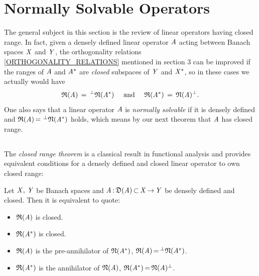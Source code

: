 \documentclass[11pt,twoside]{article}
\begin{document}
\section{Normally Solvable Operators}                                          %
The general subject in this section is the review of linear operators
having closed range.
In fact,
given a densely defined linear operator $\mathit{A}$
acting between Banach spaces $\mathit{X}$ and $\mathit{Y}$,
the orthogonality relations \eqref{ORTHOGONALITY_RELATIONS}
mentioned in section 3 can be improved
if the ranges of $\mathit{A}$ and $\mathit{A}^*$ are \textit{closed} subspaces
of $\mathit{Y}$ and $\mathit{X}^*$,
so in these cases we actually would have
\[
{\mathfrak{R}(\mathit{A}) } \,=\, ^{\bot}\mathfrak{N}(\mathit{A}^*)
\quad \mbox{ and } \quad
{\mathfrak{R}(\mathit{A}^*) } \,=\, \mathfrak{N}(\mathit{A})^{\bot}.
\]
One also says that
a linear operator $\mathit{A}$ is \textit{normally solvable}
if it is densely defined and
$\mathfrak{R}(\mathit{A}) {\,=\,} \, ^{\bot}\mathfrak{N}(\mathit{A}^*)$ holds,
which means by our next theorem that $\mathit{A}$ has closed range.

\subsection{} %
The \textit{closed range theorem}
is a classical result in functional analysis 
and provides equivalent conditions
for a densely defined and closed linear operator to own closed range:

\begin{theorem}\label{CLOSED_RANGE_THEOREM}
Let $\mathit{X},\,\mathit{Y}$ be Banach spaces
and $\mathit{A} {\,:\,} \mathfrak{D}(\mathit{A}) {\,\subset\,} \mathit{X} {\,\to\,} \mathit{Y}$
be densely defined and closed.
Then it is equivalent to quote:

\begin{itemize}[leftmargin=9mm]
\item[(a)] $\mathfrak{R}(\mathit{A})$ is closed.
\item[(b)] $\mathfrak{R}(\mathit{A}^*)$ is closed.
\item[(c)] $\mathfrak{R}(\mathit{A}) $ is the pre-annihilator of $\mathfrak{N}(\mathit{A}^*)$,
           {\ie} $\mathfrak{R}(\mathit{A}) {\,=\,} ^{\bot}\mathfrak{N}(\mathit{A}^*) $.
\item[(d)] $\mathfrak{R}(\mathit{A}^*)$ is the annihilator of $\mathfrak{N}(\mathit{A})$,
           {\ie} $\mathfrak{R}(\mathit{A}^*) {\,=\,} \mathfrak{N}(\mathit{A}) ^{\bot}$.
\end{itemize}
\end{theorem}
\end{document}

